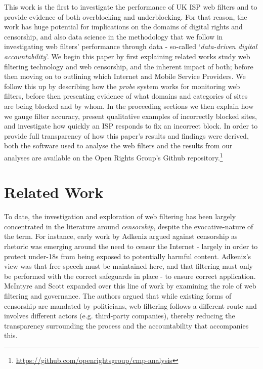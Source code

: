 \documentclass{bmcart}
\begin{document}
This work is the first to investigate the performance of UK ISP web filters and to provide evidence of both overblocking and underblocking.
For that reason, the work has huge potential for implications on the domains of digital rights and censorship, and also data science in the methodology that we follow in investigating web filters' performance through data - so-called `\textit{data-driven digital accountability}'. 
We begin this paper by first explaining related works study web filtering technology and web censorship, and the inherent impact of both; before then moving on to outlining which Internet and Mobile Service Providers.
We follow this up by describing how the \textit{probe} system works for monitoring web filters, before then presenting evidence of what domains and categories of sites are being blocked and by whom.
In the proceeding sections we then explain how we gauge filter accuracy, present qualitative examples of incorrectly blocked sites, and investigate how quickly an ISP responds to fix an incorrect block.
In order to provide full transparency of how this paper's results and findings were derived, both the software used to analyse the web filters and the results from our analyses are available on the Open Rights Group's Github repository.\footnote{\url{https://github.com/openrightsgroup/cmp-analysis}}


\section*{Related Work}
To date, the investigation and exploration of web filtering has been largely concentrated in the literature around \textit{censorship}, despite the evocative-nature of the term.
For instance, early work by Adkeniz \cite{akdeniz2001internet} argued against censorship as rhetoric was emerging around the need to censor the Internet - largely in order to protect under-18s from being exposed to potentially harmful content.
Adkeniz's view was that free speech must be maintained here, and that filtering must only be performed with the correct safeguards in place - to ensure correct application.
McIntyre and Scott \cite{mcintyre2008internet} expanded over this line of work by examining the role of web filtering and governance.
The authors argued that while existing forms of censorship are mandated by politicians, web filtering follows a different route and involves different actors (e.g. third-party companies), thereby reducing the transparency surrounding the process and the accountability that accompanies this.
\end{document}
